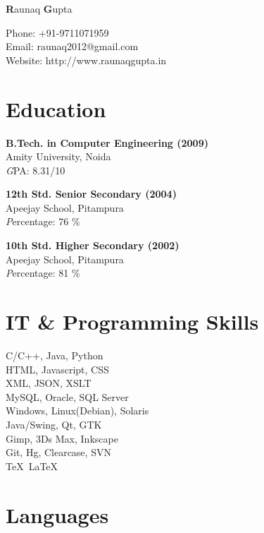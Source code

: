 \documentclass{article}
\begin{document}
\thispagestyle{empty}
\begin{minipage}[c]{0.40\textwidth}
{\bfseries\Huge R}{\Huge aunaq}
{\bfseries\Huge G}{\Huge upta}

\hfill
\par
Phone: +91-9711071959\\
Email: raunaq2012@gmail.com\\
Website: http://www.raunaqgupta.in

\section*{{\color{green} Education}}
\begin{description}
\item
\par
{\bfseries B.Tech. in Computer Engineering (2009)}\\
Amity University, Noida\\
{\emph GPA: 8.31/10}

\item
\par
{\bfseries 12th Std. Senior Secondary (2004)}\\
Apeejay School, Pitampura\\
{\emph Percentage: 76 \%}

\item
{\bfseries 10th Std. Higher Secondary (2002)}\\
Apeejay School, Pitampura\\
{\emph Percentage: 81 \%}
\end{description}

\section*{{\color{green} IT \& Programming Skills}}

C/C++, Java, Python\\
HTML, Javascript, CSS\\
XML, JSON, XSLT\\
MySQL, Oracle, SQL Server\\
Windows, Linux(Debian), Solaris\\
Java/Swing, Qt, GTK\\
Gimp, 3Ds Max, Inkscape\\
Git, Hg, Clearcase, SVN\\
\TeX\ \LaTeX\

\section*{{\color{green} Languages}}


\end{minipage}
\end{document}
